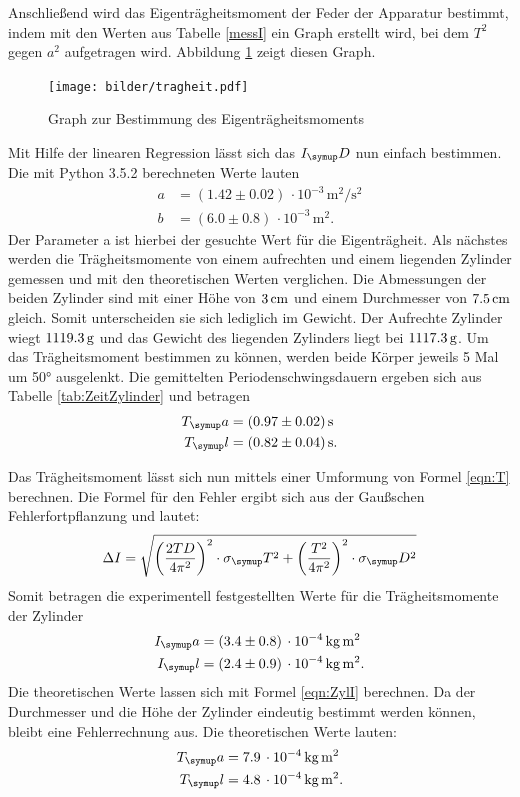 Anschließend wird das Eigenträgheitsmoment der Feder der Apparatur bestimmt,
indem mit den Werten aus Tabelle \ref{messI} ein Graph erstellt wird, bei dem
$T^2$ gegen $a^2$ aufgetragen wird. Abbildung \ref{fig:trag} zeigt diesen Graph.
\begin{figure}[H]
  \centering
  \texttt{[image: bilder/tragheit.pdf]}
  \caption{Graph zur Bestimmung des Eigenträgheitsmoments}
  \label{fig:trag}
\end{figure}
Mit Hilfe der linearen Regression lässt sich das $I_\su{D}$ nun einfach bestimmen.
Die mit Python 3.5.2 berechneten Werte lauten
\begin{align*}
  a &= (1.42 \pm 0.02)\,\cdot10^{-3} \,\si{\square\meter\per\square\second} \\
  b &= (6.0 \pm 0.8)\,\cdot10^{-3} \,\si{\square\meter}.
\end{align*}
Der Parameter a ist hierbei der gesuchte Wert für die Eigenträgheit.
Als nächstes werden die Trägheitsmomente von einem aufrechten und einem liegenden
Zylinder gemessen und mit den theoretischen Werten verglichen. Die Abmessungen
der beiden Zylinder sind mit einer Höhe von $3\,\si{\centi\meter}$ und einem Durchmesser von $7.5\,\si{\centi\meter}$
gleich. Somit unterscheiden sie sich lediglich im Gewicht. Der Aufrechte Zylinder
wiegt $1119.3\,\si{\gram}$ und das Gewicht des liegenden Zylinders liegt bei $1117.3\,\si{\gram}$.
Um das Trägheitsmoment bestimmen zu können, werden beide Körper jeweils 5 Mal um
50° ausgelenkt. Die gemittelten Periodenschwingsdauern ergeben sich aus Tabelle
\ref{tab:ZeitZylinder} und betragen
\begin{align*}
  T_\su{a} &= (0.97 \pm 0.02)\sek \\
  T_\su{l} &= (0.82 \pm 0.04)\sek.
\end{align*}

Das Trägheitsmoment lässt sich nun mittels einer Umformung von Formel \eqref{eqn:T}
berechnen. Die Formel für den Fehler ergibt sich aus der Gaußschen Fehlerfortpflanzung
und lautet:
\begin{equation*}
  \Delta I = \sqrt{\biggl(\frac{2TD}{4\pi^2}\biggr)^2\cdot\sigma_\su{T}^2 +
  \biggl(\frac{T^2}{4\pi^2}\biggr)^2\cdot\sigma_\su{D}^2}
\end{equation*}
Somit betragen die experimentell festgestellten Werte für die Trägheitsmomente
der Zylinder
\begin{align*}
  I_\su{a} &= (3.4 \pm 0.8)\,\cdot10^{-4}\,\si{\kilo\gram\square\meter} \\
  I_\su{l} &= (2.4 \pm 0.9)\,\cdot10^{-4}\,\si{\kilo\gram\square\meter}.
\end{align*}
Die theoretischen Werte lassen sich mit Formel \eqref{eqn:ZylI} berechnen.
Da der Durchmesser und die Höhe der Zylinder eindeutig bestimmt werden können,
bleibt eine Fehlerrechnung aus.
Die theoretischen Werte lauten:
\begin{align}
  T_\su{a} &= 7.9\,\cdot10^{-4}\,\si{\kilo\gram\square\meter} \\
  T_\su{l} &= 4.8\,\cdot10^{-4}\,\si{\kilo\gram\square\meter}.
\end{align}

